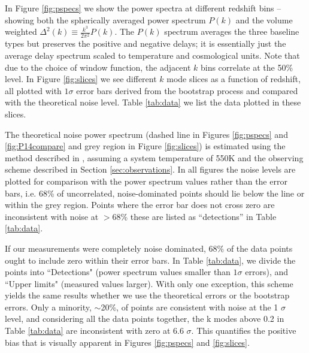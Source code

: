 \documentclass{aastex}
\begin{document}
In  Figure \ref{fig:pspecs} we show the  power spectra at different redshift bins --showing both the spherically averaged power spectrum $P(k)$ and the volume weighted  $\Delta^2(k)\equiv\frac{k^3}{2\pi^2}P(k)$.  The $P(k)$ spectrum averages the three baseline types but preserves the positive and negative delays; it is essentially just the average delay spectrum scaled to temperature and cosmological units. Note that due to the choice of window function, the adjacent $k$ bins correlate at the  50\% level. In Figure \ref{fig:slices} we see different $k$ mode slices as a function of redshift,  all plotted with $1\sigma$ error bars derived from the bootstrap process and compared with the theoretical noise level. Table \ref{tab:data} we list the data plotted in these slices.   

The theoretical noise power spectrum (dashed line in Figures \ref{fig:pspecs} and \ref{fig:P14compare} and grey region in Figure \ref{fig:slices}) is estimated using the method described in \cite{Pober:2013p9581}, assuming a system temperature of 550K and the observing scheme described in Section \ref{sec:observations}. In all figures the noise levels are plotted for comparison with the power spectrum values rather than the error bars, i.e. 68\% of uncorrelated, noise-dominated points should lie below the line or within the grey region.    Points where the error bar does not cross zero are inconsistent with noise at $>68$\% these are listed as ``detections'' in Table \ref{tab:data}.   

If our measurements were completely noise dominated, $68\%$ of the data points ought to include zero within their error bars.  In Table \ref{tab:data}, we divide the points into ``Detections" (power spectrum values smaller than $1\sigma$ errors), and ``Upper limits" (measured values larger).  With only one exception, this scheme yields the same results whether we use the theoretical errors or the bootstrap errors.  Only a minority, $\sim$20\%, of points are consistent with noise at the 1 $\sigma$ level, and considering all the data points together, the k modes above 0.2 in Table \ref{tab:data} are inconsistent with zero at 6.6 $\sigma$.  This quantifies the positive bias that is visually apparent in Figures \ref{fig:pspecs} and \ref{fig:slices}.

\end{document}
